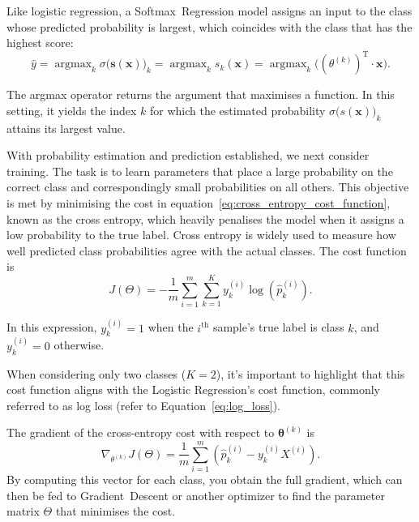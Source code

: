 \documentclass[12pt,letter]{article}
\begin{document}
Like logistic regression, a Softmax~Regression model assigns an input to the class whose predicted probability is largest, which coincides with the class that has the highest score:
\begin{equation}
\hat{y} = \mathop{\text{argmax}}_{k} \sigma \big(\textbf{s}(\textbf{x})\big)_k = \mathop{\text{argmax}}_{k} s_k(\textbf{x}) = \mathop{\text{argmax}}_{k} \big( (\theta^{(k)})^\text{T} \cdot \textbf{x} \big).
\end{equation}


\begin{mdframed}[middlelinewidth=0.5mm]
\begin{center}
\end{center}
The argmax operator returns the argument that maximises a function. In this setting, it yields the index $k$ for which the estimated probability $\sigma \bigl(s(\mathbf{x})\bigr)_k$ attains its largest value.
\end{mdframed}



With probability estimation and prediction established, we next consider training. The task is to learn parameters that place a large probability on the correct class and correspondingly small probabilities on all others. This objective is met by minimising the cost in equation~\ref{eq:cross_entropy_cost_function}, known as the cross entropy, which heavily penalises the model when it assigns a low probability to the true label. Cross entropy is widely used to measure how well predicted class probabilities agree with the actual classes. The cost function is
\begin{equation}
J(\Theta) = -\frac{1}{m} \sum_{i=1}^{m} \sum_{k=1}^{K} y_k^{(i)} \log (\hat{p}_k^{(i)}).
\label{eq:cross_entropy_cost_function}
\end{equation}

\begin{mdframed}[middlelinewidth=0.5mm]
\begin{center}
\end{center}
In this expression, $y_k^{(i)} = 1$ when the $i^\text{th}$ sample's true label is class $k$, and $y_k^{(i)} = 0$ otherwise.
\end{mdframed}
When considering only two classes ($K = 2$), it's important to highlight that this cost function aligns with the Logistic Regression's cost function, commonly referred to as log loss (refer to Equation~\ref{eq:log_loss}).

The gradient of the cross-entropy cost with respect to $\boldsymbol{\theta}^{(k)}$ is
\begin{equation}
\nabla_{\theta^{(k)}}J(\Theta) = \frac{1}{m} \sum_{i=1}^{m} (\hat{p}_k^{(i)}-y_k^{(i)} X^{(i)}).
\end{equation}
By computing this vector for each class, you obtain the full gradient, which can then be fed to Gradient~Descent or another optimizer to find the parameter matrix $\Theta$ that minimises the cost.
\end{document}
